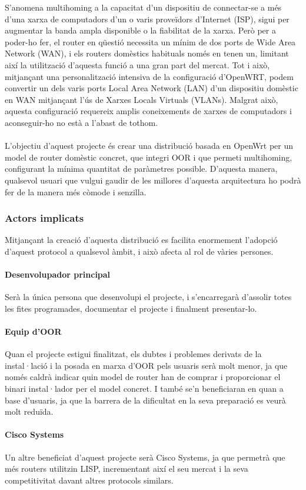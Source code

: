 \documentclass[11pt]{article}
\begin{document}
S’anomena multihoming a la capacitat d’un dispositiu de connectar-se a més d’una xarxa de computadors d’un o varis proveïdors d’Internet (ISP), sigui per augmentar la banda ampla disponible o la fiabilitat de la xarxa. Però per a poder-ho fer, el router en qüestió necessita un mínim de dos ports de Wide Area Network (WAN), i els routers domèstics habituals només en tenen un, limitant així la utilització d’aquesta funció a una gran part del mercat. Tot i això, mitjançant una personalització intensiva de la configuració d’OpenWRT, podem convertir un dels varis ports Local Area Network (LAN) d’un dispositiu domèstic en WAN mitjançant l’ús de Xarxes Locals Virtuals (VLANs). Malgrat això, aquesta configuració requereix amplis coneixements de xarxes de computadors i aconseguir-ho no està a l’abast de tothom.\\
\\
L’objectiu d’aquest projecte és crear una distribució basada en OpenWrt per un model de router domèstic concret, que integri OOR i que permeti multihoming, configurant la mínima quantitat de paràmetres possible. D’aquesta manera, qualsevol usuari que vulgui gaudir de les millores d’aquesta arquitectura ho podrà fer de la manera més còmode i senzilla.

\subsubsection{Actors implicats}
Mitjançant la creació d’aquesta distribució es facilita enormement l’adopció d’aquest protocol a qualsevol àmbit, i això afecta al rol de vàries persones.
\paragraph{Desenvolupador principal}
Serà la única persona que desenvolupi el projecte, i s’encarregarà d’assolir totes les fites programades, documentar el projecte i finalment presentar-lo.
\paragraph{Equip d’OOR}
Quan el projecte estigui finalitzat, els dubtes i problemes derivats de la instal·lació i la posada en marxa d’OOR pels usuaris serà molt menor, ja que només caldrà indicar quin model de router han de comprar i proporcionar el binari instal·lador per el model concret. I també se’n beneficiaran en quan a base d’usuaris,  ja que la barrera de la dificultat en la seva preparació es veurà molt reduïda.
\paragraph{Cisco Systems}
Un altre beneficiat d’aquest projecte serà Cisco Systems, ja que permetrà que més routers utilitzin LISP, incrementant així el seu mercat i la seva competitivitat davant altres protocols similars.
\end{document}
